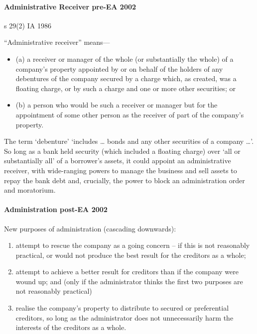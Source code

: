 \documentclass[
]{article}
\providecommand{\tightlist}{%
  \setlength{\itemsep}{0pt}\setlength{\parskip}{0pt}}
\newenvironment{env-99ba4262-5297-4318-9547-86307715f49a}
{
    \savenotes\tcolorbox[blanker,breakable,left=5pt,borderline west={2pt}{-4pt}{green}]
}
{
    \endtcolorbox\spewnotes
}
\begin{document}
\hypertarget{administrative-receiver-pre-ea-2002}{%
\paragraph{Administrative Receiver pre-EA
2002}\label{administrative-receiver-pre-ea-2002}}

\begin{env-99ba4262-5297-4318-9547-86307715f49a}

s 29(2) IA 1986

``Administrative receiver'' means---

\begin{itemize}
\tightlist
\item
  (a) a receiver or manager of the whole (or substantially the whole) of
  a company's property appointed by or on behalf of the holders of any
  debentures of the company secured by a charge which, as created, was a
  floating charge, or by such a charge and one or more other securities;
  or
\item
  (b) a person who would be such a receiver or manager but for the
  appointment of some other person as the receiver of part of the
  company's property.
\end{itemize}

\end{env-99ba4262-5297-4318-9547-86307715f49a}

The term `debenture' `includes \ldots{} bonds and any other securities
of a company \ldots'. So long as a bank held security (which included a
floating charge) over `all or substantially all' of a borrower's assets,
it could appoint an administrative receiver, with wide-ranging powers to
manage the business and sell assets to repay the bank debt and,
crucially, the power to block an administration order and moratorium.

\hypertarget{administration-post-ea-2002}{%
\paragraph{Administration post-EA
2002}\label{administration-post-ea-2002}}

New purposes of administration (cascading downwards):

\begin{enumerate}
\tightlist
\item
  attempt to rescue the company as a going concern -- if this is not
  reasonably practical, or would not produce the best result for the
  creditors as a whole;
\item
  attempt to achieve a better result for creditors than if the company
  were wound up; and (only if the administrator thinks the first two
  purposes are not reasonably practical)
\item
  realise the company's property to distribute to secured or
  preferential creditors, so long as the administrator does not
  unnecessarily harm the interests of the creditors as a whole.
\end{enumerate}
\end{document}

